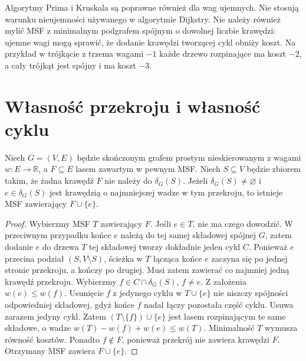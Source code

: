 \begin{uwaga}
Algorytmy Prima i Kruskala są poprawne również dla wag
ujemnych. Nie stosują warunku nieujemności używanego
w algorytmie Dijkstry. Nie należy również mylić MSF
z minimalnym podgrafem spójnym o dowolnej liczbie krawędzi:
ujemne wagi mogą sprawić, że dodanie krawędzi
tworzącej cykl obniży koszt. Na przykład w trójkącie
z trzema wagami $-1$ każde drzewo rozpinające ma koszt
$-2$, a cały trójkąt jest spójny i ma koszt $-3$.
\end{uwaga}

\section{Własność przekroju i własność cyklu}
\label{sec:tg-mst-cut-cycle}

\begin{twierdzenie}
\label{thm:tg-mst-cut}
Niech $G=(V,E)$ będzie skończonym grafem prostym
nieskierowanym z wagami $w:E\to\mathbb R$,
a $F\subseteq E$ lasem zawartym w pewnym MSF.
Niech $S\subseteq V$ będzie zbiorem takim, że żadna
krawędź $F$ nie należy do $\delta_G(S)$.
Jeżeli $\delta_G(S)\ne\varnothing$ i
$e\in\delta_G(S)$ jest krawędzią o najmniejszej
wadze w tym przekroju, to istnieje MSF
zawierający $F\cup\{e\}$.
\end{twierdzenie}
\begin{proof}
Wybierzmy MSF $T$ zawierający $F$.
Jeśli $e\in T$, nie ma czego dowodzić.
W przeciwnym przypadku końce $e$ należą
do tej samej składowej spójnej $G$, zatem
dodanie $e$ do drzewa $T$ tej składowej
tworzy dokładnie jeden cykl $C$.
Ponieważ $e$ przecina podział $(S,V\setminus S)$,
ścieżka w $T$ łącząca końce $e$ zaczyna się po jednej
stronie przekroju, a kończy po drugiej. Musi zatem
zawierać co najmniej jedną krawędź przekroju. Wybierzmy
$f\in C\cap\delta_G(S)$, $f\ne e$.
Z założenia $w(e)\leq w(f)$.
Usunięcie $f$ z jedynego cyklu w $T\cup\{e\}$
nie niszczy spójności odpowiedniej składowej,
gdyż końce $f$ nadal łączy pozostała część cyklu.
Usuwa zarazem jedyny cykl. Zatem
$(T\setminus\{f\})\cup\{e\}$ jest lasem rozpinającym
te same składowe, o wadze $w(T)-w(f)+w(e)\leq w(T)$.
Minimalność $T$ wymusza równość kosztów.
Ponadto $f\notin F$, ponieważ przekrój nie
zawiera krawędzi $F$. Otrzymany MSF zawiera
$F\cup\{e\}$.
\end{proof}

